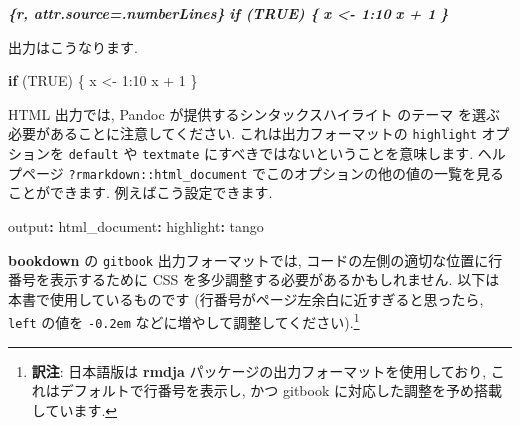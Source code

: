 \documentclass[
  11pt,
  lualatex,
  ja=standard]{bxjsreport}
\newenvironment{Shaded}{\begin{snugshade}}{\end{snugshade}}
\newcommand{\AttributeTok}[1]{\textcolor[rgb]{0.77,0.63,0.00}{#1}}
\newcommand{\ConstantTok}[1]{\textcolor[rgb]{0.00,0.00,0.00}{#1}}
\newcommand{\ControlFlowTok}[1]{\textcolor[rgb]{0.13,0.29,0.53}{\textbf{#1}}}
\newcommand{\DecValTok}[1]{\textcolor[rgb]{0.00,0.00,0.81}{#1}}
\newcommand{\FunctionTok}[1]{\textcolor[rgb]{0.00,0.00,0.00}{#1}}
\newcommand{\InformationTok}[1]{\textcolor[rgb]{0.56,0.35,0.01}{\textbf{\textit{#1}}}}
\newcommand{\KeywordTok}[1]{\textcolor[rgb]{0.13,0.29,0.53}{\textbf{#1}}}
\newcommand{\NormalTok}[1]{#1}
\newcommand{\OtherTok}[1]{\textcolor[rgb]{0.56,0.35,0.01}{#1}}
\newcommand{\SpecialCharTok}[1]{\textcolor[rgb]{0.00,0.00,0.00}{#1}}
\begin{document}
\begin{Shaded}
\begin{Highlighting}[]
\InformationTok{\textasciigrave{}\textasciigrave{}\textasciigrave{}\{r, attr.source=\textquotesingle{}.numberLines\textquotesingle{}\}}
\InformationTok{if (TRUE) \{}
\InformationTok{  x \textless{}{-} 1:10}
\InformationTok{  x + 1}
\InformationTok{\}}
\InformationTok{\textasciigrave{}\textasciigrave{}\textasciigrave{}}
\end{Highlighting}
\end{Shaded}

出力はこうなります.

\begin{Shaded}
\begin{Highlighting}[numbers=left,,]
\ControlFlowTok{if}\NormalTok{ (}\ConstantTok{TRUE}\NormalTok{) \{}
\NormalTok{  x }\OtherTok{\textless{}{-}} \DecValTok{1}\SpecialCharTok{:}\DecValTok{10}
\NormalTok{  x }\SpecialCharTok{+} \DecValTok{1}
\NormalTok{\}}
\end{Highlighting}
\end{Shaded}

HTML 出力では, Pandoc が提供するシンタックスハイライト のテーマ を選ぶ必要があることに注意してください. これは出力フォーマットの \texttt{highlight} オプションを \texttt{default} や \texttt{textmate} にすべきではないということを意味します. ヘルプページ \texttt{?rmarkdown::html\_document} でこのオプションの他の値の一覧を見ることができます. 例えばこう設定できます.

\begin{Shaded}
\begin{Highlighting}[]
\FunctionTok{output}\KeywordTok{:}
\AttributeTok{  }\FunctionTok{html\_document}\KeywordTok{:}
\AttributeTok{    }\FunctionTok{highlight}\KeywordTok{:}\AttributeTok{ tango}
\end{Highlighting}
\end{Shaded}

\textbf{bookdown} の \texttt{gitbook} 出力フォーマットでは, コードの左側の適切な位置に行番号を表示するために CSS を多少調整する必要があるかもしれません. 以下は本書で使用しているものです (行番号がページ左余白に近すぎると思ったら, \texttt{left} の値を \texttt{-0.2em} などに増やして調整してください).\footnote{\textbf{訳注}: 日本語版は \textbf{rmdja} パッケージの出力フォーマットを使用しており, これはデフォルトで行番号を表示し, かつ gitbook に対応した調整を予め搭載しています.}
\end{document}
